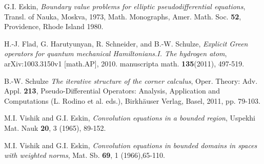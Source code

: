 \documentclass[10pt,a4paper]{article}
\begin{document}
\begin{thebibliography}{6}

 G.I. Eskin, \textit{Boundary value problems for elliptic pseudodifferential equations}, Transl. of Nauka, Moskva, 1973, Math. Monographs, Amer. Math. Soc. \textbf{52}, Providence, Rhode Island 1980.

 H.-J. Flad, G. Harutyunyan, R. Schneider, and B.-W. Schulze, \textit{Explicit Green operators for quantum mechanical Hamiltonians.I. The hydrogen atom}, arXiv:1003.3150v1 [math.AP], 2010. manuscripta math. \textbf{135}(2011), 497-519.



 B.-W. Schulze \textit{The iterative structure of the corner calculus}, Oper. Theory: Adv. Appl. \textbf{213}, Pseudo-Differential Operators: Analysis, Application and Computations (L. Rodino et al. eds.), Birkh\" auser Verlag, Basel, 2011, pp. 79-103.

 M.I. Vishik and G.I. Eskin, \textit{Convolution equations in a bounded region}, Uspekhi Mat. Nauk \textbf{20}, 3 (1965), 89-152.

 M.I. Vishik and G.I. Eskin, \textit{Convolution equations in bounded domains in spaces with weighted norms}, Mat. Sb. \textbf{69}, 1 (1966),65-110.


\end{thebibliography}
\end{document}
